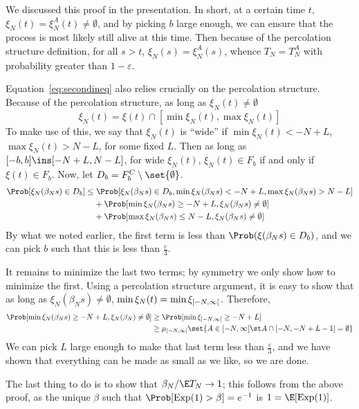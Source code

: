 \documentclass{scrartcl}
\newcommand{\ep}{\varepsilon}
\newcommand{\roi}[2]{\interval[open right]{#1}{#2}}
\newcommand{\Ninf}{\roi{-N}{\infty}}
\begin{document}
We discussed this proof in the presentation. In short, at a certain time $t$, $\xi_{N}(t) = \xi_{N}^{A}(t) \neq \emptyset$, and by picking $b$ large enough, we can ensure that the process is most likely still alive at this time. Then because of the percolation structure definition, for all $s > t$, $\xi_{N}(s) = \xi_{N}^{A}(s)$, whence $T_{N} = T_{N}^{A}$ with probability greater than $1 - \ep$.

Equation~\ref{eq:secondineq} also relies crucially on the percolation structure. Because of the percolation structure, as long as $\xi_{N}(t) \neq \emptyset$
\[ \xi_{N}(t) = \xi(t) \cap [\min \xi_{N}(t), \max \xi_{N}(t)] \]
To make use of this, we say that $\xi_{N}(t)$ is ``wide'' if $\min \xi_{N}(t) < -N + L$, $\max \xi_{N}(t) > N - L$, for some fixed $L$. Then as long as $[-b,b] \ins [-N+L, N-L]$, for wide $\xi_{N}(t)$, $\xi_{N}(t) \in F_{b}$ if and only if $\xi(t) \in F_{b}$. Now, let $D_{b} = F_{b}^{C} \setminus \set{\emptyset}$.
\begin{align*}
  \Prob[\xi_{N}(\beta_{N}s) \in D_{b}] \leq&\; \Prob[\xi_{N}(\beta_{N}s) \in D_{b}, \min \xi_{N}(\beta_{N}s) < -N + L, \max \xi_{N}(\beta_{N}s) > N - L] \\
                                &+ \Prob[\min \xi_{N}(\beta_{N}s) \geq -N + L, \xi_{N}(\beta_{N}s) \neq \emptyset] \\
                                &+ \Prob[\max \xi_{N}(\beta_{N}s) \leq N - L, \xi_{N}(\beta_{N}s) \neq \emptyset]
\end{align*}
By what we noted earlier, the first term is less than $\Prob(\xi(\beta_{N}s) \in D_{b})$, and we can pick $b$ such that this is less than $\frac{\ep}{3}$.

It remains to minimize the last two terms; by symmetry we only show how to minimize the first. Using a percolation structure argument, it is easy to show that as long as $\xi_{N}(\beta_{N}s) \neq \emptyset$, $\min \xi_{N}(t) = \min \xi_{\Ninf}$. Therefore,
\begin{align*}
  \Prob[\min \xi_{N}(\beta_{N}s) \geq -N + L, \xi_{N}(\beta_{N}) \neq \emptyset] &\geq \Prob[\min \xi_{\Ninf} \geq -N+L] \\
  &\geq \mu_{\Ninf}\set{A \in \Ninf \st A \cap [-N,-N+L-1] = \emptyset}
\end{align*}
We can pick $L$ large enough to make that last term less than $\frac{\ep}{3}$, and we have shown that everything can be made as small as we like, so we are done.

The last thing to do is to show that $\beta_{N}/\E T_{N} \to 1$; this follows from the above proof, as the unique $\beta$ such that $\Prob[\mathrm{Exp}(1) > \beta] = e^{-1}$ is $1 = \E[\mathrm{Exp}(1)]$.
\end{document}
